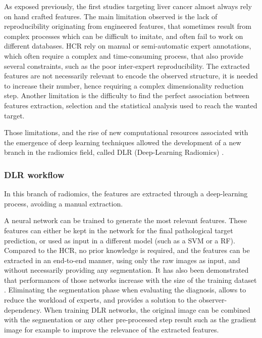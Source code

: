 \documentclass[]{article}
\begin{document}
As exposed previously, the first studies targeting liver cancer almost
always rely on hand crafted features.
The main limitation observed is the lack of reproducibility originating
from engineered features, that sometimes result from complex processes
which can be difficult to imitate, and often fail to work on different
databases.
HCR rely on manual or semi-automatic expert annotations, which
often require a complex and time-consuming process, that also provide
several constraints, such as the poor inter-expert reproducibility.
The extracted features are not necessarily relevant to encode the
observed structure, it is needed to increase their number, hence
requiring a complex dimensionality reduction step.
Another limitation is the difficulty to find the perfect association
between features extraction, selection and the statistical analysis used
to reach the wanted target.

Those limitations, and the rise of new computational resources
associated with the emergence of deep learning techniques allowed the
development of a new branch in the radiomics field, called DLR
(Deep-Learning Radiomics) \cite{Afshar2018}.

\subsubsection{DLR workflow}\label{dlr-workflow}

In this branch of radiomics, the features are extracted through a
deep-learning process, avoiding a manual extraction.

A neural network can be trained to generate the most relevant features.
These features can either be kept in the network for the final
pathological target prediction, or used as input in a different model
(such as a SVM or a RF).
Compared to the HCR, no prior knowledge is required, and the
features can be extracted in an end-to-end manner, using only the raw
images as input, and without necessarily providing any segmentation. It
has also been demonstrated that performances of those networks increase
with the size of the training dataset \cite{Cheng2016}.
Eliminating the segmentation phase when evaluating the diagnosis, allows
to reduce the workload of experts, and provides a solution to the
observer-dependency.
When training DLR networks, the original image can be combined
with the segmentation or any other pre-processed step result such as the
gradient image for example \cite{Sun2017a} to improve
the relevance of the extracted features.
\end{document}
